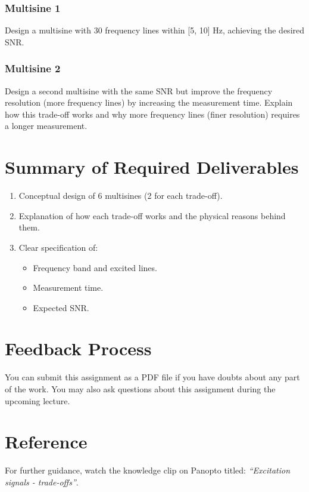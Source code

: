 \documentclass[a4paper,12pt]{article}
\begin{document}
\subsubsection*{Multisine 1}
Design a multisine with 30 frequency lines within [5, 10] Hz, achieving the desired SNR.
\subsubsection*{Multisine 2}
Design a second multisine with the same SNR but improve the frequency resolution (more frequency lines) by increasing the measurement time. Explain how this trade-off works and why more frequency lines (finer resolution) requires a longer measurement.

\section*{Summary of Required Deliverables}
\begin{enumerate}
    \item Conceptual design of 6 multisines (2 for each trade-off).
    \item Explanation of how each trade-off works and the physical reasons behind them.
    \item Clear specification of:
    \begin{itemize}
        \item Frequency band and excited lines.
        \item Measurement time.
        \item Expected SNR.
    \end{itemize}
\end{enumerate}

\section*{Feedback Process}
You can submit this assignment as a PDF file if you have doubts about any part of the work. You may also ask questions about this assignment during the upcoming lecture.

\section*{Reference}
For further guidance, watch the knowledge clip on Panopto titled:
\emph{``Excitation signals - trade-offs''}.
\end{document}
